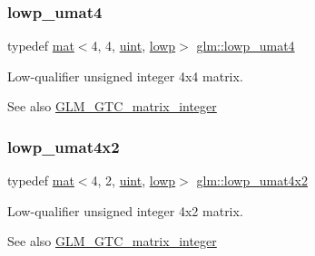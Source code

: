 \subsubsection{\texorpdfstring{lowp\+\_\+umat4}{lowp\_umat4}}
{\footnotesize\ttfamily typedef \hyperlink{structglm_1_1mat}{mat}$<$4, 4, \hyperlink{group__core__precision_ga4fd29415871152bfb5abd588334147c8}{uint}, \hyperlink{namespaceglm_a36ed105b07c7746804d7fdc7cc90ff25ae161af3fc695e696ce3bf69f7332bc2d}{lowp}$>$ \hyperlink{group__gtc__matrix__integer_ga41cc5d910308e4b471aa6543ce22dd20}{glm\+::lowp\+\_\+umat4}}

Low-\/qualifier unsigned integer 4x4 matrix. \begin{DoxySeeAlso}{See also}
\hyperlink{group__gtc__matrix__integer}{G\+L\+M\+\_\+\+G\+T\+C\+\_\+matrix\+\_\+integer} 
\end{DoxySeeAlso}
\mbox{\label{group__gtc__matrix__integer_ga3fbd04409a7da041e61b868a002089f2}} 
\subsubsection{\texorpdfstring{lowp\+\_\+umat4x2}{lowp\_umat4x2}}
{\footnotesize\ttfamily typedef \hyperlink{structglm_1_1mat}{mat}$<$4, 2, \hyperlink{group__core__precision_ga4fd29415871152bfb5abd588334147c8}{uint}, \hyperlink{namespaceglm_a36ed105b07c7746804d7fdc7cc90ff25ae161af3fc695e696ce3bf69f7332bc2d}{lowp}$>$ \hyperlink{group__gtc__matrix__integer_ga3fbd04409a7da041e61b868a002089f2}{glm\+::lowp\+\_\+umat4x2}}

Low-\/qualifier unsigned integer 4x2 matrix. \begin{DoxySeeAlso}{See also}
\hyperlink{group__gtc__matrix__integer}{G\+L\+M\+\_\+\+G\+T\+C\+\_\+matrix\+\_\+integer} 
\end{DoxySeeAlso}
\mbox{\label{group__gtc__matrix__integer_ga5eb6bfe468dd615e0a78fb9f3ca813c6}} 

